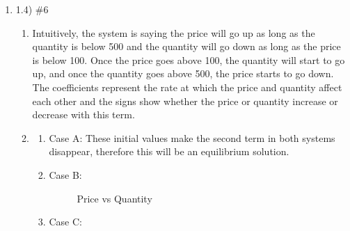 \documentclass[12pt,letterpaper]{article}
\begin{document}
\begin{enumerate}
\item 1.4) \#6
  \begin{enumerate}
    \item Intuitively, the system is saying the price will go up as long as the quantity
    is below 500 and the quantity will go down as long as the price is below 100. Once the 
    price goes above 100, the quantity will start to go up, and once the quantity goes 
    above 500, the price starts to go down. The coefficients represent the rate at which 
    the price and quantity affect each other and the signs show whether the price or quantity
    increase or decrease with this term. 
    \pagebreak
    \item 
    \begin{enumerate}
      \item Case A: These initial values make the second term in both systems disappear, therefore
            this will be an equilibrium solution. 
      \item Case B: 
            \begin{figure}[!htb]
              \caption{\label{fig:7} Price vs Quantity}
            \end{figure}
      \item Case C: 
            \begin{figure}[!htb]

\end{figure}
\end{enumerate}
\end{enumerate}
\end{enumerate}
\end{document}
